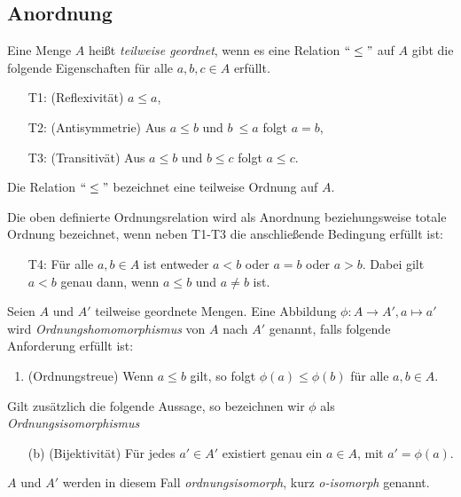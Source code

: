 \subsection{Anordnung}
\begin{defn}\label{defgs} 
Eine Menge $A$ heißt \textit{teilweise geordnet}, wenn es eine Relation $``\leq " $ auf $A$ gibt die folgende Eigenschaften für alle $ a,b,c \in A$  erfüllt.
%
\begin{enumerate}
\item[T1:] (Reflexivität)  $a \leq  a$,
\item[T2:] (Antisymmetrie)  Aus $a \leq  b$ und $b~ \leq a$ folgt $a = b$,
\item[T3:] (Transitivät) Aus $a \leq b$ und $b \leq c$ folgt $a \leq c$.
\end{enumerate}
%
Die Relation $``\leq "$ bezeichnet eine teilweise Ordnung auf $A$.
\end{defn}
Die oben definierte Ordnungsrelation wird als Anordnung beziehungsweise totale Ordnung bezeichnet, wenn neben T1-T3 die anschließende Bedingung erfüllt ist:
%
\begin{enumerate}
\item[T4:] Für alle $a, b \in A$ ist entweder $a < b$ oder $a = b$ oder $a > b$. Dabei gilt $a < b$ genau dann, wenn $a \leq b$ und $a\neq b$ ist. 
\end{enumerate}
%
%
%
%
%
%
%
\begin{defn}\label{ordnungsisomorph}
Seien $A$ und $A'$ teilweise geordnete Mengen. Eine Abbildung $\phi \colon A \rightarrow A', a \mapsto a'$ wird \textit{Ordnungshomomorphismus} von $A$ nach $A'$ genannt, falls folgende Anforderung erfüllt ist:
\begin{enumerate}
\item (Ordnungstreue) Wenn $a \leq b$ gilt, so folgt $\phi(a) \leq \phi(b)$ für alle $a, b  \in A$.
\end{enumerate}
Gilt zusätzlich die folgende Aussage, so bezeichnen wir $\phi$ als \textit{Ordnungsisomorphismus}
\begin{enumerate}
\item[(b)] (Bijektivität) Für jedes $a' \in A'$ existiert genau ein $a \in A$, mit $a' = \phi(a)$.
\end{enumerate}
$A$ und $A'$ werden in diesem Fall \textit{ordnungsisomorph}, kurz \textit{o-isomorph} genannt.
\end{defn}
